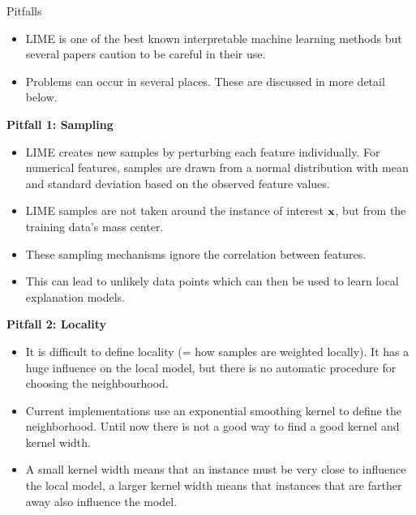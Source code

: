 \documentclass[11pt,compress,t,notes=noshow, xcolor=table]{beamer}
\begin{document}
\begin{vbframe}{Pitfalls}
  \begin{itemize}
  	\item LIME is one of the best known interpretable machine learning methods but several papers caution to be careful in their use. 
  	\item Problems can occur in several places. These are discussed in more detail below. 
  \end{itemize}
	\textbf{Pitfall 1: Sampling}
	\begin{itemize}
      \item LIME creates new samples by perturbing each feature individually. For numerical features, samples are drawn from a normal distribution with mean and standard deviation based on the observed feature values.   
      \item LIME samples are not taken around the instance of interest $\xv$, but from the training data's mass center.
      \item These sampling mechanisms ignore the correlation between features. 
      \item This can lead to unlikely data points which can then be used to learn local explanation models. 
    \end{itemize}
\framebreak
	\textbf{Pitfall 2: Locality}
	\begin{itemize} 
     \item It is difficult to define locality (= how samples are weighted locally). It has a huge influence on the local model, but there is no automatic procedure for choosing the neighbourhood. 
     \item Current implementations use an exponential smoothing kernel to define the neighborhood. 
     Until now there is not a good way to find a good kernel and kernel width. 
     \item A small kernel width means that an instance must be very close to influence the local model, a larger kernel width means that instances that are farther away also influence the model. 
   \end{itemize}
\end{vbframe}
\end{document}

